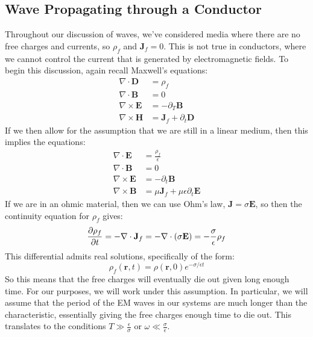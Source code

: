 \subsection{Wave Propagating through a Conductor}
Throughout our discussion of waves, we've considered media where there are no free charges and currents, so
\( \rho_f \) and \( \mathbf{J}_f = 0 \). This is not true in conductors, where we cannot control the current
that is generated by electromagnetic fields. To begin this discussion, again recall Maxwell's equations:
\begin{align*}
	\nabla \cdot \mathbf{D} &= \rho_f\\
	\nabla \cdot \mathbf{B} &= 0\\
	\nabla \times \mathbf{E} &= -\partial_T \mathbf{B} \\ 
	\nabla \times \mathbf{H} &= \mathbf{J}_f + \partial_t \mathbf{D} 
\end{align*}
If we then allow for the assumption that we are still in a linear medium, then this implies the equations:
\begin{align*}
	\nabla \cdot \mathbf{E} &= \frac{\rho_f}{\epsilon} \\ 
	\nabla \cdot \mathbf{B} &=  0 \\ 
	\nabla \times \mathbf{E} &= -\partial_t \mathbf{B}\\
	\nabla \times \mathbf{B} &= \mu \mathbf{J}_f + \mu \epsilon \partial_t \mathbf{E}
\end{align*}
If we are in an ohmic material, then we can use Ohm's law, \( \mathbf{J} = \sigma \mathbf{E} \), so then the
continuity equation for \( \rho_f \) gives:
\[
	\pdv{\rho_f}{t} = - \nabla \cdot \mathbf{J}_f = -\nabla \cdot (\sigma \mathbf{E}) 
	= - \frac{\sigma}{\epsilon} \rho_f
\]
This differential admits real solutions, specifically of the form: 
\[
	\rho_f(\mathbf{r}, t) = \rho(\mathbf{r}, 0) e^{- \sigma / \epsilon t}
\]
So this means that the free charges will eventually die out given long enough time. For our purposes, we will
work under this assumption. In particular, we will assume that the period of the EM waves in our systems are
much longer than the characteristic, essentially giving the free charges enough time to die out. This
translates to the conditions \( T \gg \frac{\epsilon}{\sigma} \) or \( \omega \ll \frac{\sigma}{\epsilon} \). 

 





